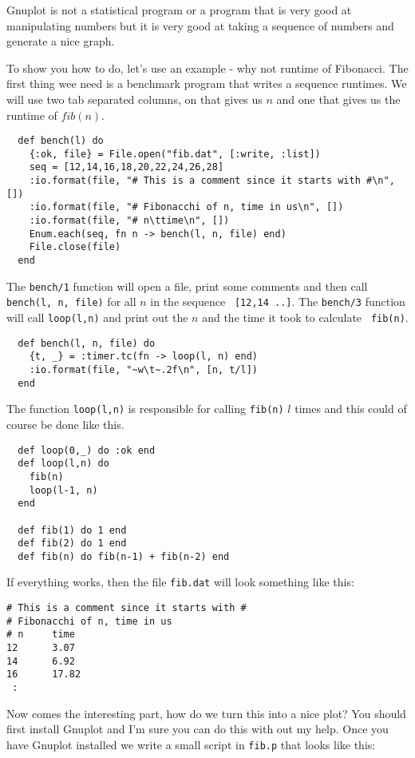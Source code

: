 \documentclass[a4paper,11pt]{article}
\begin{document}
Gnuplot is not a statistical program or a program that is very good at
manipulating numbers but it is very good at taking a sequence of
numbers and generate a nice graph.

To show you how to do, let's use an example - why not runtime of
Fibonacci. The first thing wee need is a benchmark program that writes
a sequence runtimes. We will use two tab separated columns, on that
gives us $n$ and one that gives us the runtime of $fib(n)$. 

\begin{verbatim}
  def bench(l) do
    {:ok, file} = File.open("fib.dat", [:write, :list])
    seq = [12,14,16,18,20,22,24,26,28]
    :io.format(file, "# This is a comment since it starts with #\n", [])
    :io.format(file, "# Fibonacchi of n, time in us\n", [])
    :io.format(file, "# n\ttime\n", [])
    Enum.each(seq, fn n -> bench(l, n, file) end)
    File.close(file)
  end
\end{verbatim}

The {\tt bench/1} function will open a file, print some comments and
then call {\tt bench(l, n, file)} for all $n$ in the sequence {\tt
  [12,14 ..]}.  The {\tt bench/3} function will call {\tt loop(l,n)}
and print out the $n$ and the time it took to calculate {\tt
  fib(n)}. 

\begin{verbatim}
  def bench(l, n, file) do
    {t, _} = :timer.tc(fn -> loop(l, n) end)
    :io.format(file, "~w\t~.2f\n", [n, t/l])
  end
\end{verbatim}

The function {\tt loop(l,n)} is responsible for calling {\tt fib(n)}
$l$ times and this could of course be done like this.

\begin{verbatim}
  def loop(0,_) do :ok end
  def loop(l,n) do 
    fib(n)
    loop(l-1, n)
  end
  
  def fib(1) do 1 end
  def fib(2) do 1 end
  def fib(n) do fib(n-1) + fib(n-2) end
\end{verbatim}

If everything works, then the file {\tt fib.dat} will look something like this:

\begin{verbatim}
# This is a comment since it starts with #
# Fibonacchi of n, time in us
# n     time
12      3.07
14      6.92
16      17.82
 :
\end{verbatim}

Now comes the interesting part, how do we turn this into a nice plot?
You should first install Gnuplot and I'm sure you can do this with
out my help. Once you have Gnuplot installed we write a small script in
{\tt fib.p} that looks like this:
\end{document}
